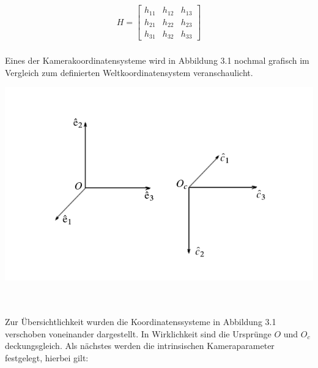 \begin{gather}
H=
\begin{bmatrix}
h_{11}&h_{12}&h_{13}\\
h_{21}&h_{22}&h_{23}\\
h_{31}&h_{32}&h_{33}
\end{bmatrix}
\end{gather}\\

Eines der Kamerakoordinatensysteme wird in Abbildung 3.1 nochmal grafisch im Vergleich zum definierten Weltkoordinatensystem veranschaulicht.

\begin{minipage}{\linewidth}
	\centering
	\includegraphics[width=1.\linewidth]{images/Rotation.png}
\end{minipage}\\ \\

Zur Übersichtlichkeit wurden die Koordinatenssysteme in Abbildung 3.1 verschoben voneinander dargestellt. In Wirklichkeit sind die Ursprünge \ensuremath{O} und \ensuremath{O_c} deckungsgleich. Als nächstes werden die intrinsischen Kameraparameter festgelegt, hierbei gilt: 

